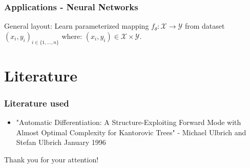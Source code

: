 \documentclass{beamer}
\begin{document}
\begin{frame}[t]
	\frametitle{Applications - Neural Networks}
	General layout: Learn parameterized mapping
	$f_\theta : \mathcal{X} \to \mathcal{Y}$ from dataset
	$(x_i, y_i)_{i \in \{
				1, \ldots, n
				\} }$
	where:
	$(x_i, y_i) \in \mathcal{X} \times \mathcal{Y}$.
	\vspace{5mm}

	\begin{enumerate}
	\end{enumerate}

\end{frame}

\section{Literature}
\begin{frame}
	\frametitle{Literature used}
	\begin{itemize}
		\item "Automatic Differentiation: A Structure-Exploiting Forward
		      Mode with Almost Optimal Complexity for Kantorovic Trees"
		      - Michael Ulbrich and Stefan Ulbrich January 1996
	\end{itemize}
\end{frame}

\begin{frame}
	\begin{center}
		\Large{Thank you for your attention!}
	\end{center}
\end{frame}
\end{document}
